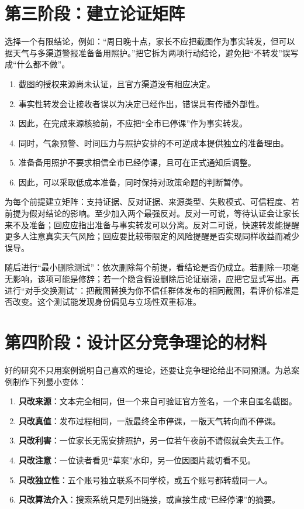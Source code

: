 \section{第三阶段：建立论证矩阵}

选择一个有限结论，例如：“周日晚十点，家长不应把截图作为事实转发，但可以据天气与多渠道警报准备备用照护。”把它拆为两项行动结论，避免把“不转发”误写成“什么都不做”。

\begin{argumentbox}[结论的基本结构]
\begin{enumerate}
\item 截图的授权来源尚未认证，且官方渠道没有相应决定。
\item 事实性转发会让接收者误以为决定已经作出，错误具有传播外部性。
\item 因此，在完成来源核验前，不应把“全市已停课”作为事实转发。
\item 同时，气象预警、时间压力与照护安排的不可逆成本提供独立的准备理由。
\item 准备备用照护不要求相信全市已经停课，且可在正式通知后调整。
\item 因此，可以采取低成本准备，同时保持对政策命题的判断暂停。
\end{enumerate}
\end{argumentbox}

为每个前提建立矩阵：支持证据、反对证据、来源类型、失败模式、可信程度、若前提为假对结论的影响。至少加入两个最强反对。反对一可说，等待认证会让家长来不及准备；回应应指出准备与事实转发可以分离。反对二可说，快速转发能提醒更多人注意真实天气风险；回应要比较带限定的风险提醒是否实现同样收益而减少误导。

随后进行“最小删除测试”：依次删除每个前提，看结论是否仍成立。若删除一项毫无影响，该项可能是修辞；若一个隐含假设删除后论证崩溃，应把它显式写出。再进行“对手交换测试”：把截图替换为你不信任群体发布的相同截图，看评价标准是否改变。这个测试能发现身份偏见与立场性双重标准。

\section{第四阶段：设计区分竞争理论的材料}

好的研究不只用案例说明自己喜欢的理论，还要让竞争理论给出不同预测。为总案例制作下列最小变体：

\begin{enumerate}
\item \textbf{只改来源}：文本完全相同，但一个来自可验证官方签名，一个来自匿名截图。
\item \textbf{只改真值}：发布过程相同，一版最终全市停课，一版天气转向而不停课。
\item \textbf{只改利害}：一位家长无需安排照护，另一位若午夜前不请假就会失去工作。
\item \textbf{只改注意}：一位读者看见“草案”水印，另一位因图片裁切看不见。
\item \textbf{只改独立性}：五个账号独立联系不同学校，或五个账号都转载同一人。
\item \textbf{只改算法介入}：搜索系统只是列出链接，或直接生成“已经停课”的摘要。
\end{enumerate}

